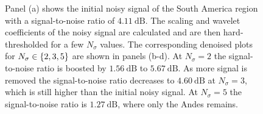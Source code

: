 \begin{figure}[htpb]
	\caption[
		A denoising demonstration for a map of South America
	]{
		Panel (a) shows the initial noisy signal of the South America region with a signal-to-noise ratio of \(\SI{4.11}{\dB}\).
		The scaling and wavelet coefficients of the noisy signal are calculated and are then hard-thresholded for a few \(N_{\sigma}\) values.
		The corresponding denoised plots for \(N_{\sigma} \in \{2, 3, 5\}\) are shown in panels (b-d).
		At \(N_{\sigma}=2\) the signal-to-noise ratio is boosted by \(\SI{1.56}{\dB}\) to \(\SI{5.67}{\dB}\).
		As more signal is removed the signal-to-noise ratio decreases to \(\SI{4.60}{\dB}\) at \(N_{\sigma}=3\), which is still higher than the initial noisy signal.
		At \(N_{\sigma}=5\) the signal-to-noise ratio is \(\SI{1.27}{\dB}\), where only the Andes remains.
	}\label{fig:chapter4_denoising}
\end{figure}
